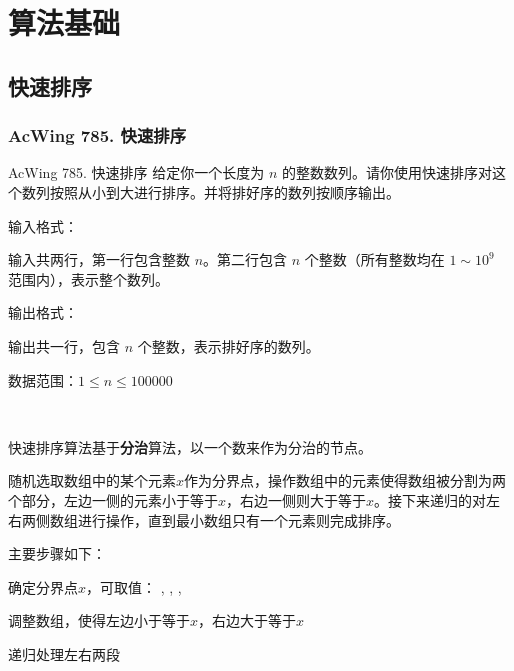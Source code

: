 \chapter{算法基础}


\section{快速排序}

\subsection{AcWing 785. 快速排序}

\begin{titledbox}{AcWing 785. 快速排序}
    给定你一个长度为 $n$ 的整数数列。请你使用快速排序对这个数列按照从小到大进行排序。并将排好序的数列按顺序输出。

    输入格式：

    输入共两行，第一行包含整数 $n$。第二行包含 $n$ 个整数（所有整数均在 $1 \sim 10^9$ 范围内），表示整个数列。

    输出格式：

    输出共一行，包含 $n$ 个整数，表示排好序的数列。

    数据范围：$1 \le n \le 100000$

    \begin{inputblock}
         \\
    \end{inputblock}
    \begin{outputblock}
    \end{outputblock}
\end{titledbox}

快速排序算法基于\textbf{分治}算法，以一个数来作为分治的节点。

随机选取数组中的某个元素$x$作为分界点，操作数组中的元素使得数组被分割为两个部分，左边一侧的元素小于等于$x$，右边一侧则大于等于$x$。接下来递归的对左右两侧数组进行操作，直到最小数组只有一个元素则完成排序。

主要步骤如下：
\begin{myenum}
    \item 确定分界点$x$，可取值： ,  ,  , 
    \item 调整数组，使得左边小于等于$x$，右边大于等于$x$
    \item 递归处理左右两段
\end{myenum}

